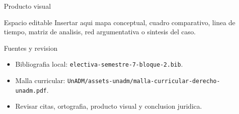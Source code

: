 \documentclass[
  spanish,
  aspectratio=169,
  xcolor={dvipsnames,table}
]{beamer}
\begin{document}
\begin{frame}{Producto visual}
  \begin{block}{Espacio editable}
    Insertar aqui mapa conceptual, cuadro comparativo, linea de tiempo,
    matriz de analisis, red argumentativa o sintesis del caso.
  \end{block}
  \centering
\end{frame}

\begin{frame}{Fuentes y revision}
  \begin{itemize}
    \item Bibliografia local: \texttt{electiva-semestre-7-bloque-2.bib}.
    \item Malla curricular: \texttt{UnADM/assets-unadm/malla-curricular-derecho-unadm.pdf}.
    \item Revisar citas, ortografia, producto visual y conclusion juridica.
  \end{itemize}
\end{frame}
\end{document}
